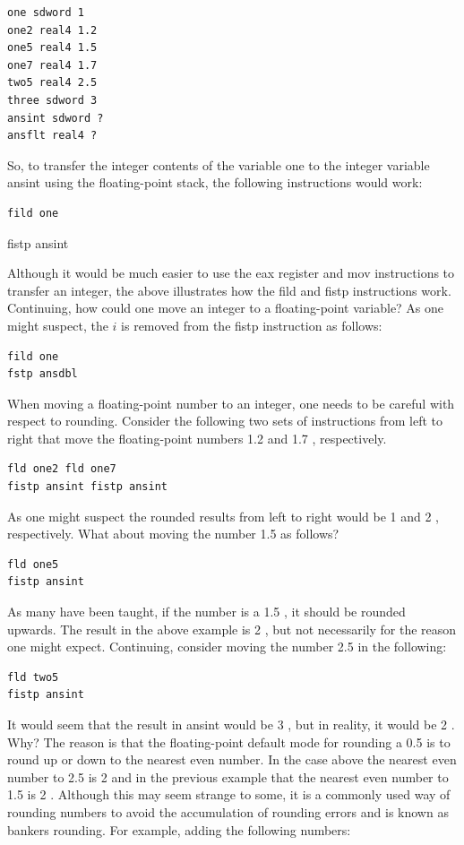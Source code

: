 \documentclass[10pt]{book}
\begin{document}
\begin{verbatim}
one sdword 1
one2 real4 1.2
one5 real4 1.5
one7 real4 1.7
two5 real4 2.5
three sdword 3
ansint sdword ?
ansflt real4 ?
\end{verbatim}

So, to transfer the integer contents of the variable one to the integer variable ansint using the floating-point stack, the following instructions would work:

\begin{verbatim}
fild one
\end{verbatim}

fistp ansint

Although it would be much easier to use the eax register and mov instructions to transfer an integer, the above illustrates how the fild and fistp instructions work. Continuing, how could one move an integer to a floating-point variable? As one might suspect, the $i$ is removed from the fistp instruction as follows:

\begin{verbatim}
fild one
fstp ansdbl
\end{verbatim}

When moving a floating-point number to an integer, one needs to be careful with respect to rounding. Consider the following two sets of instructions from left to right that move the floating-point numbers 1.2 and 1.7 , respectively.


\begin{verbatim}
fld one2 fld one7
fistp ansint fistp ansint
\end{verbatim}

As one might suspect the rounded results from left to right would be 1 and 2 , respectively. What about moving the number 1.5 as follows?

\begin{verbatim}
fld one5
fistp ansint
\end{verbatim}

As many have been taught, if the number is a 1.5 , it should be rounded upwards. The result in the above example is 2 , but not necessarily for the reason one might expect. Continuing, consider moving the number 2.5 in the following:

\begin{verbatim}
fld two5
fistp ansint
\end{verbatim}

It would seem that the result in ansint would be 3 , but in reality, it would be 2 . Why? The reason is that the floating-point default mode for rounding a 0.5 is to round up or down to the nearest even number. In the case above the nearest even number to 2.5 is 2 and in the previous example that the nearest even number to 1.5 is 2 . Although this may seem strange to some, it is a commonly used way of rounding numbers to avoid the accumulation of rounding errors and is known as bankers rounding. For example, adding the following numbers:
\end{document}

